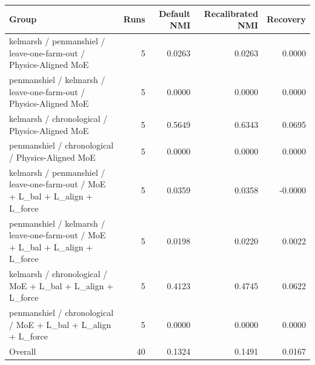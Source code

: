 \begin{tabular}{lrrrr}
\toprule
Group & Runs & Default NMI & Recalibrated NMI & Recovery \\
\midrule
kelmarsh / penmanshiel / leave-one-farm-out / Physics-Aligned MoE & 5 & 0.0263 & 0.0263 & 0.0000 \\
penmanshiel / kelmarsh / leave-one-farm-out / Physics-Aligned MoE & 5 & 0.0000 & 0.0000 & 0.0000 \\
kelmarsh / chronological / Physics-Aligned MoE & 5 & 0.5649 & 0.6343 & 0.0695 \\
penmanshiel / chronological / Physics-Aligned MoE & 5 & 0.0000 & 0.0000 & 0.0000 \\
kelmarsh / penmanshiel / leave-one-farm-out / MoE + L\_bal + L\_align + L\_force & 5 & 0.0359 & 0.0358 & -0.0000 \\
penmanshiel / kelmarsh / leave-one-farm-out / MoE + L\_bal + L\_align + L\_force & 5 & 0.0198 & 0.0220 & 0.0022 \\
kelmarsh / chronological / MoE + L\_bal + L\_align + L\_force & 5 & 0.4123 & 0.4745 & 0.0622 \\
penmanshiel / chronological / MoE + L\_bal + L\_align + L\_force & 5 & 0.0000 & 0.0000 & 0.0000 \\
Overall & 40 & 0.1324 & 0.1491 & 0.0167 \\
\bottomrule
\end{tabular}
